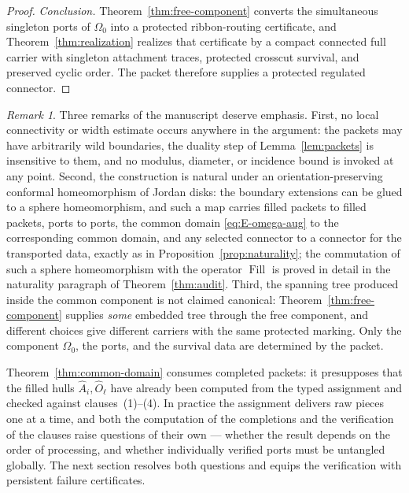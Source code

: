 \documentclass[11pt,reqno]{amsart}
\theoremstyle{definition}
\theoremstyle{remark}
\newtheorem{remark}[theorem]{Remark}
\newcommand{\Fill}{\operatorname{Fill}}
\begin{document}
\begin{proof}
\emph{Conclusion.}
Theorem~\ref{thm:free-component} converts the simultaneous singleton ports of
$\Omega_0$ into a protected ribbon-routing certificate, and
Theorem~\ref{thm:realization} realizes that certificate by a compact connected full
carrier with singleton attachment traces, protected crosscut survival, and preserved
cyclic order. The packet therefore supplies a protected regulated connector.
\end{proof}

\begin{remark}\label{rem:E-common-domain}
Three remarks of the manuscript \cite{MWman} deserve emphasis. First, no local
connectivity or width estimate occurs anywhere in the argument: the packets may have
arbitrarily wild boundaries, the duality step of Lemma~\ref{lem:packets} is
insensitive to them, and no modulus, diameter, or incidence bound is invoked at any
point. Second, the construction is natural under an orientation-preserving conformal
homeomorphism of Jordan disks: the boundary extensions can be glued to a sphere
homeomorphism, and such a map carries filled packets to filled packets, ports to
ports, the common domain \eqref{eq:E-omega-aug} to the corresponding common domain,
and any selected connector to a connector for the transported data, exactly as in
Proposition~\ref{prop:naturality}; the commutation of such a sphere homeomorphism
with the operator $\Fill$ is proved in detail in the naturality paragraph of
Theorem~\ref{thm:audit}. Third, the spanning tree produced inside the common
component is not claimed canonical: Theorem~\ref{thm:free-component} supplies
\emph{some} embedded tree through the free component, and different choices give
different carriers with the same protected marking. Only the component $\Omega_0$,
the ports, and the survival data are determined by the packet.
\end{remark}

Theorem~\ref{thm:common-domain} consumes completed packets: it presupposes that the
filled hulls $\widehat A_i,\widehat O_\ell$ have already been computed from the typed
assignment and checked against clauses~(1)--(4). In practice the assignment delivers
raw pieces one at a time, and both the computation of the completions and the
verification of the clauses raise questions of their own --- whether the result
depends on the order of processing, and whether individually verified ports must be
untangled globally. The next section resolves both questions and equips the
verification with persistent failure certificates.
\end{document}
